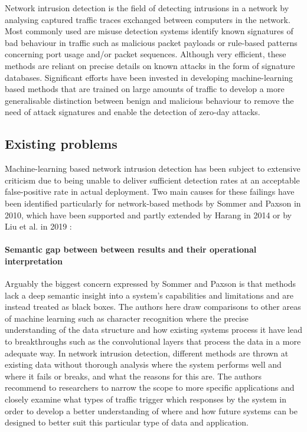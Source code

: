\documentclass[sigconf]{acmart}
\begin{document}
Network intrusion detection is the field of detecting intrusions in a network by analysing captured traffic traces exchanged between computers in the network. Most commonly used are misuse detection systems identify known signatures of bad behaviour in traffic such as malicious packet payloads or rule-based patterns concerning port usage and/or packet sequences. Although very efficient, these methods are reliant on precise details on known attacks in the form of signature databases. Significant efforts have been invested in developing machine-learning based methods that are trained on large amounts of traffic to develop a more generalisable distinction between benign and malicious behaviour to remove the need of attack signatures and enable the detection of zero-day attacks.


\subsection{Existing problems}

Machine-learning based network intrusion detection has been subject to extensive criticism due to being unable to deliver sufficient detection rates at an acceptable false-positive rate in actual deployment. Two main causes for these failings have been identified particularly for network-based methods by Sommer and Paxson \cite{sommer2010outside} in 2010, which have been supported and partly extended by Harang \cite{harang2014bridging} in 2014 or by Liu et al. in 2019 \cite{liu2019machine}:


\paragraph{Semantic gap between between results and their operational interpretation}

Arguably the biggest concern expressed by Sommer and Paxson is that methods lack a deep semantic insight into a system's capabilities and limitations and are instead treated as black boxes. The authors here draw comparisons to other areas of machine learning such as character recognition where the precise understanding of the data structure and how existing systems process it have lead to breakthroughs such as the convolutional layers that process the data in a more adequate way. In network intrusion detection, different methods are thrown at existing data without thorough analysis where the system performs well and where it fails or breaks, and what the reasons for this are. The authors recommend to researchers to narrow the scope to more specific applications and closely examine what types of traffic trigger which responses by the system in order to develop a better understanding of where and how future systems can be designed to better suit this particular type of data and application. 
\end{document}
